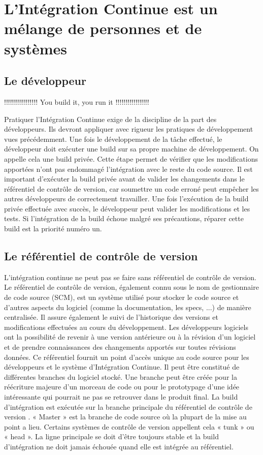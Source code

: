   \section{L’Intégration Continue est un mélange de personnes et de systèmes}

    \subsection{Le développeur}
    !!!!!!!!!!!!!!!!! You build it, you run it !!!!!!!!!!!!!!!!!

    Pratiquer l’Intégration Continue exige de la discipline de la part des développeurs. Ils devront appliquer avec rigueur les pratiques de développement vues précédemment. Une fois le développement de la tâche effectué, le développeur doit exécuter une build sur sa propre machine de développement. On appelle cela une build privée. Cette étape permet de vérifier que les modifications apportées n’ont pas endommagé l'intégration avec le reste du code source. Il est important d'exécuter la build privée avant de valider les changements dans le référentiel de contrôle de version, car soumettre un code erroné peut empêcher les autres développeurs de correctement travailler. Une fois l’exécution de la build privée effectuée avec succès, le développeur peut valider les modifications et les tests. Si l'intégration de la build échoue malgré ses précautions, réparer cette build est la priorité numéro un.

    \subsection{Le référentiel de contrôle de version}
    L'intégration continue ne peut pas se faire sans référentiel de contrôle de version. Le référentiel de contrôle de version, également connu sous le nom de gestionnaire de code source (SCM), est un système utilisé pour stocker le code source et d'autres aspects du logiciel (comme la documentation, les specs, ...) de manière centralisée. Il assure également le suivi de l'historique des versions et modifications effectuées au cours du développement. Les développeurs logiciels ont la possibilité de revenir à une version antérieure ou à la révision d'un logiciel et de prendre connaissances des changements apportés sur toutes révisions données. Ce référentiel fournit un point d'accès unique au code source pour les développeurs et le système d’Intégration Continue. Il peut être constitué de différentes branches du logiciel stocké. Une branche peut être créée pour la réécriture majeure d’un morceau de code ou pour le prototypage d’une idée intéressante qui pourrait ne pas se retrouver dans le produit final. La build d’intégration est exécutée sur la branche principale du référentiel de contrôle de version \cite{Duv07}. « Master » est la branche de code source où la plupart de la mise au point a lieu. Certains systèmes de contrôle de version appellent cela « tunk » ou « head ». La ligne principale se doit d’être toujours stable et la build d’intégration ne doit jamais échouée quand elle est intégrée au référentiel.


